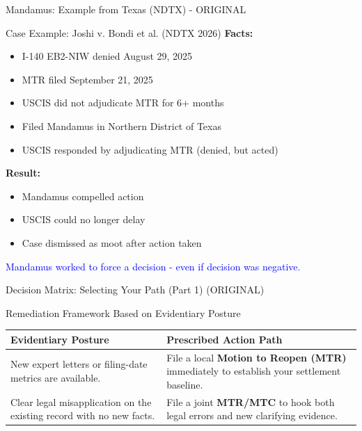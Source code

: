 \documentclass[11pt]{beamer}
\begin{document}
	\begin{frame}{Mandamus: Example from Texas (NDTX) - ORIGINAL}
		\scriptsize
		\begin{block}{Case Example: Joshi v. Bondi et al. (NDTX 2026)}
			\textbf{Facts:}
			\begin{itemize}
				\item I-140 EB2-NIW denied August 29, 2025
				\item MTR filed September 21, 2025
				\item USCIS did not adjudicate MTR for 6+ months
				\item Filed Mandamus in Northern District of Texas
				\item USCIS responded by adjudicating MTR (denied, but acted)
			\end{itemize}
			\textbf{Result:}
			\begin{itemize}
				\item Mandamus compelled action
				\item USCIS could no longer delay
				\item Case dismissed as moot after action taken
			\end{itemize}
			\textcolor{blue}{Mandamus worked to force a decision - even if decision was negative.}
		\end{block}
	\end{frame}
	
	
	\begin{frame}{Decision Matrix: Selecting Your Path (Part 1) (ORIGINAL)}
		\scriptsize
		\begin{block}{Remediation Framework Based on Evidentiary Posture}
			\centering
			\begin{tabular}{|p{4cm}|p{6.5cm}|}
				\hline
				\textbf{Evidentiary Posture} & \textbf{Prescribed Action Path} \\
				\hline
				New expert letters or filing-date metrics are available. & File a local \textbf{Motion to Reopen (MTR)} immediately to establish your settlement baseline. \\
				\hline
				Clear legal misapplication on the existing record with no new facts. & File a joint \textbf{MTR/MTC} to hook both legal errors and new clarifying evidence. \\
				\hline
			\end{tabular}
		\end{block}
	\end{frame}
	
\end{document}
